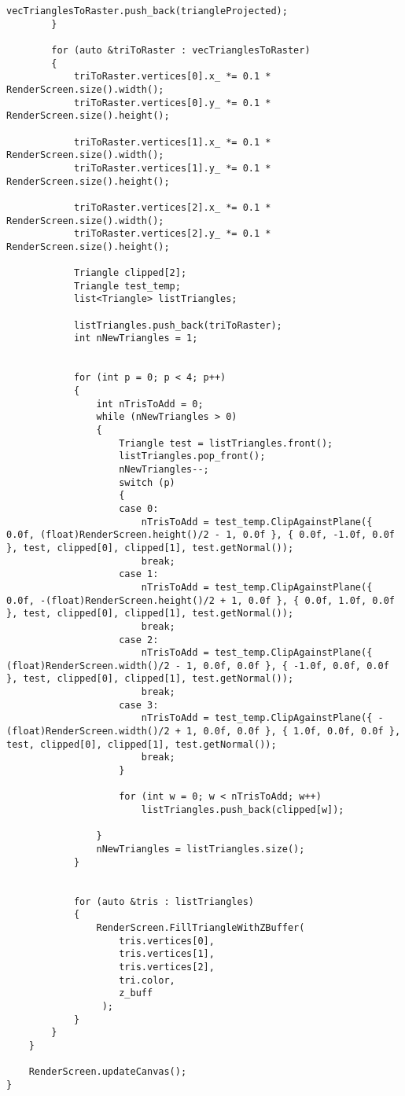 \begin{lstlisting}[caption = Реализация общего алгоритма отрисовки, label = lst:render]
            vecTrianglesToRaster.push_back(triangleProjected);
        }

        for (auto &triToRaster : vecTrianglesToRaster)
        {
            triToRaster.vertices[0].x_ *= 0.1 * RenderScreen.size().width();
            triToRaster.vertices[0].y_ *= 0.1 * RenderScreen.size().height();

            triToRaster.vertices[1].x_ *= 0.1 * RenderScreen.size().width();
            triToRaster.vertices[1].y_ *= 0.1 * RenderScreen.size().height();

            triToRaster.vertices[2].x_ *= 0.1 * RenderScreen.size().width();
            triToRaster.vertices[2].y_ *= 0.1 * RenderScreen.size().height();

            Triangle clipped[2];
            Triangle test_temp;
            list<Triangle> listTriangles;

            listTriangles.push_back(triToRaster);
            int nNewTriangles = 1;


            for (int p = 0; p < 4; p++)
            {
                int nTrisToAdd = 0;
                while (nNewTriangles > 0)
                {
                    Triangle test = listTriangles.front();
                    listTriangles.pop_front();
                    nNewTriangles--;
                    switch (p)
                    {
                    case 0:
                        nTrisToAdd = test_temp.ClipAgainstPlane({ 0.0f, (float)RenderScreen.height()/2 - 1, 0.0f }, { 0.0f, -1.0f, 0.0f }, test, clipped[0], clipped[1], test.getNormal());
                        break;
                    case 1:
                        nTrisToAdd = test_temp.ClipAgainstPlane({ 0.0f, -(float)RenderScreen.height()/2 + 1, 0.0f }, { 0.0f, 1.0f, 0.0f }, test, clipped[0], clipped[1], test.getNormal());
                        break;
                    case 2:
                        nTrisToAdd = test_temp.ClipAgainstPlane({ (float)RenderScreen.width()/2 - 1, 0.0f, 0.0f }, { -1.0f, 0.0f, 0.0f }, test, clipped[0], clipped[1], test.getNormal());
                        break;
                    case 3:
                        nTrisToAdd = test_temp.ClipAgainstPlane({ -(float)RenderScreen.width()/2 + 1, 0.0f, 0.0f }, { 1.0f, 0.0f, 0.0f }, test, clipped[0], clipped[1], test.getNormal());
                        break;
                    }

                    for (int w = 0; w < nTrisToAdd; w++)
                        listTriangles.push_back(clipped[w]);

                }
                nNewTriangles = listTriangles.size();
            }


            for (auto &tris : listTriangles)
            {
                RenderScreen.FillTriangleWithZBuffer(
                    tris.vertices[0],
                    tris.vertices[1],
                    tris.vertices[2],
                    tri.color,
                    z_buff
                 );
            }
        }
    }

    RenderScreen.updateCanvas();
}
\end{lstlisting}

